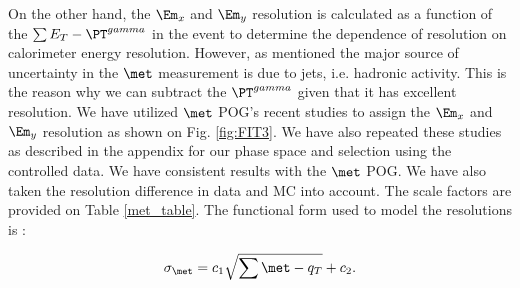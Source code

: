 On the other hand, the ${\Em_x}$ and ${\Em_y}$ resolution is calculated as a function of the $\sum E_T - \PT^{gamma}$ in the event to determine the dependence of \met resolution on calorimeter energy resolution. However, as mentioned the major source of uncertainty in the $\met$ measurement is due to jets, i.e. hadronic activity. This is the reason why we can subtract the $\PT^{gamma}$ given that it has excellent resolution.  We have utilized ${\met}$ POG's recent studies to assign the ${\Em_x}$ and ${\Em_y}$ resolution as shown on Fig. \ref{fig:FIT3}. We have also repeated these studies as described in the appendix for our phase space and selection using the controlled data. We have consistent results with the ${\met}$ POG. We have also taken the resolution difference in data and MC into account. The scale factors are provided on Table \ref{met_table}. The functional form used to model the resolutions is \cite{metReso}:

\begin{equation}\label{eq:metreso}
\sigma_{\met} = c_1\sqrt{\sum{\met-q_T}} + c_2 .
\end{equation}


